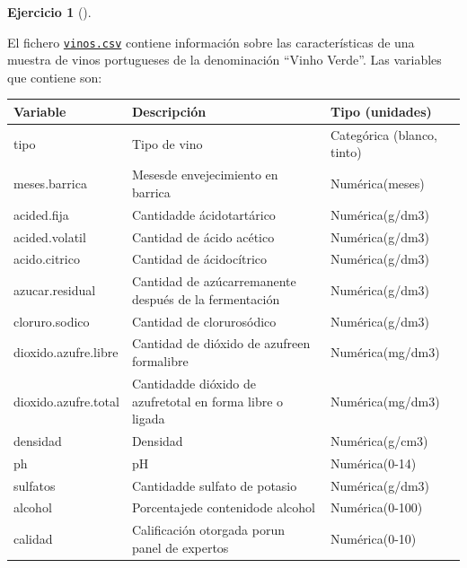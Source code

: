 \documentclass[
  a4paper,
]{scrreport}
\theoremstyle{definition}
\newtheorem{exercise}{Ejercicio}[chapter]
\theoremstyle{remark}
\begin{document}
\begin{exercise}[]\protect\hypertarget{exr-arboles-decision-3}{}\label{exr-arboles-decision-3}

El fichero \href{datos/vinos.csv}{\texttt{vinos.csv}} contiene
información sobre las características de una muestra de vinos
portugueses de la denominación ``Vinho Verde''. Las variables que
contiene son:

\begin{longtable}[]{@{}
  >{\raggedright\arraybackslash}p{}
  >{\raggedright\arraybackslash}p{}
  >{\raggedright\arraybackslash}p{}@{}}
\toprule\noalign{}
\begin{minipage}[b]{\linewidth}\raggedright
Variable
\end{minipage} & \begin{minipage}[b]{\linewidth}\raggedright
Descripción
\end{minipage} & \begin{minipage}[b]{\linewidth}\raggedright
Tipo (unidades)
\end{minipage} \\
\midrule\noalign{}
\endhead
\bottomrule\noalign{}
\endlastfoot
tipo & Tipo de vino & Categórica (blanco, tinto) \\
meses.barrica & Mesesde envejecimiento en barrica & Numérica(meses) \\
acided.fija & Cantidadde ácidotartárico & Numérica(g/dm3) \\
acided.volatil & Cantidad de ácido acético & Numérica(g/dm3) \\
acido.citrico & Cantidad de ácidocítrico & Numérica(g/dm3) \\
azucar.residual & Cantidad de azúcarremanente después de la fermentación
& Numérica(g/dm3) \\
cloruro.sodico & Cantidad de clorurosódico & Numérica(g/dm3) \\
dioxido.azufre.libre & Cantidad de dióxido de azufreen formalibre &
Numérica(mg/dm3) \\
dioxido.azufre.total & Cantidadde dióxido de azufretotal en forma libre
o ligada & Numérica(mg/dm3) \\
densidad & Densidad & Numérica(g/cm3) \\
ph & pH & Numérica(0-14) \\
sulfatos & Cantidadde sulfato de potasio & Numérica(g/dm3) \\
alcohol & Porcentajede contenidode alcohol & Numérica(0-100) \\
calidad & Calificación otorgada porun panel de expertos &
Numérica(0-10) \\
\end{longtable}


\end{exercise}
\end{document}
